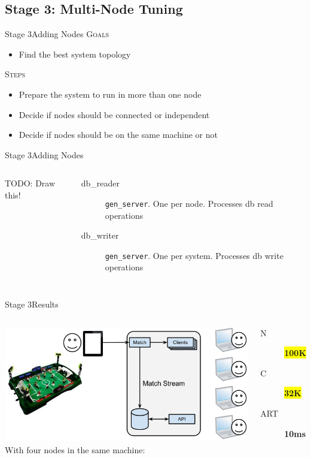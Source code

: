 \documentclass[utf8]{beamer}
\begin{document}
\subsection{Stage 3: Multi-Node Tuning}
\begin{frame}{Stage 3}{Adding Nodes}
	\textsc{Goals}
	\begin{itemize}
		\item Find the best system topology
	\end{itemize}
	\pause
	\textsc{Steps}
	\begin{itemize}
		\item Prepare the system to run in more than one node
		\item Decide if nodes should be connected or independent
		\item Decide if nodes should be on the same machine or not
	\end{itemize}
\end{frame}
\begin{frame}{Stage 3}{Adding Nodes}
	\begin{columns}
			\begin{center}
				{\Huge TODO: Draw this!}
			\end{center}
			\begin{description}
				\item[db\_reader]
					\texttt{gen\_server}. One per node. Processes db read operations
				\item[db\_writer]
					\texttt{gen\_server}. One per \alert{system}. Processes db write operations
			\end{description}
	\end{columns}
\end{frame}
\begin{frame}{Stage 3}{Results}
	\begin{columns}
		\column{.65\textwidth}
			\includegraphics[top=-1,width=\textwidth]{img/results-4.png}
		\column{.34\textwidth}
			With four nodes in the same machine:
			\begin{description}
				\item[N] \textbf{\colorbox{yellow}{\Large 100K}}
				\item[C] \textbf{\colorbox{yellow}{\Large 32K}}
				\item[ART] \textbf{\Large 10ms}
			\end{description}
	\end{columns}
\end{frame}
\end{document}
